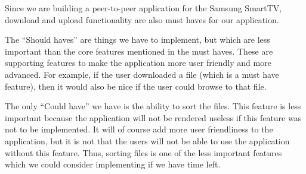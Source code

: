 Since we are building a peer-to-peer application for the Samsung SmartTV, download and upload functionality are also must haves for our application.

The ``Should haves'' are things we have to implement, but which are less important than the core features mentioned in the must haves. These are
supporting features to make the application more user friendly and more advanced. For example, if the user downloaded a file (which is a must have feature),
 then it would also be nice if the user could browse to that file.

The only ``Could have'' we have is the ability to sort the files. This feature is less important because the application will not be rendered useless
if this feature was not to be implemented. It will of course add more user friendliness to the application, but it is not that the users
 will not be able to use the application without this feature. Thus, sorting files is one of the less important features which we could consider
 implementing if we have time left.

